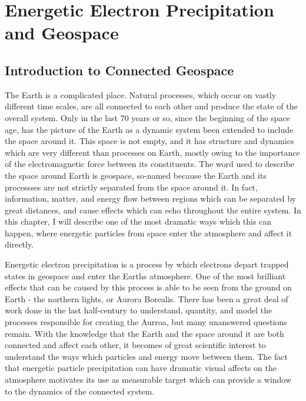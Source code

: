 \chapter{Energetic Electron Precipitation and Geospace}

\section{Introduction to Connected Geospace}

The Earth is a complicated place. Natural processes, which occur on vastly different time scales, are all connected to each other and produce the state of the overall system. Only in the last 70 years or so, since the beginning of the space age, has the picture of the Earth as a dynamic system been extended to include the space around it. This space is not empty, and it has structure and dynamics which are very different than processes on Earth, mostly owing to the importance of the electromagnetic force between its constituents. The word used to describe the space around Earth is geospace, so-named because the Earth and its processses are not strictly separated from the space around it. In fact, information, matter, and energy flow between regions which can be separated by great distances, and cause effects which can echo throughout the entire system. In this chapter, I will describe one of the most dramatic ways which this can happen, where energetic particles from space enter the atmosphere and affect it directly. 

Energetic electron precipitation is a process by which electrons depart trapped states in geospace and enter the Earths atmosphere. One of the most brilliant effects that can be caused by this process is able to be seen from the ground on Earth - the northern lights, or Aurora Borealis. There has been a great deal of work done in the last half-century to understand, quantity, and model the processes responsible for creating the Aurroa, but many unanswered questions remain. With the knowledge that the Earth and the space around it are both connected and affect each other, it becomes of great scientific interest to understand the ways which particles and energy move between them. The fact that energetic particle precipitation can have dramatic visual affects on the atmosphere motivates its use as measurable target which can provide a window to the dynamics of the connected system. 

